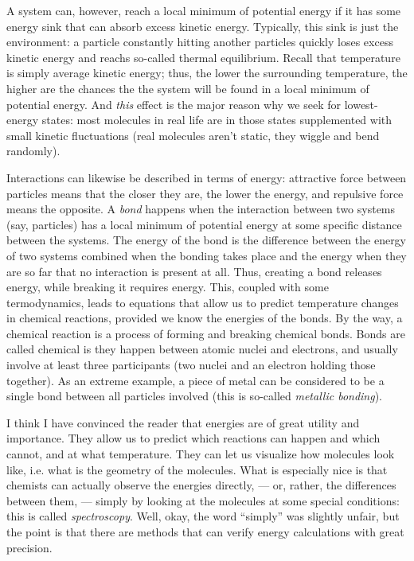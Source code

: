 \documentclass{article}
\begin{document}
A system can, however, reach a local minimum of potential energy if it has some energy sink that can absorb excess kinetic energy. Typically, this sink is just the environment: a particle constantly hitting another particles quickly loses excess kinetic energy and reachs so-called thermal equilibrium. Recall that temperature is simply average kinetic energy; thus, the lower the surrounding temperature, the higher are the chances the the system will be found in a local minimum of potential energy. And \textit{this} effect is the major reason why we seek for lowest-energy states: most molecules in real life are in those states supplemented with small kinetic fluctuations (real molecules aren't static, they wiggle and bend randomly).

Interactions can likewise be described in terms of energy: attractive force between particles means that the closer they are, the lower the energy, and repulsive force means the opposite. A \textit{bond} happens when the interaction between two systems (say, particles) has a local minimum of potential energy at some specific distance between the systems. The energy of the bond is the difference between the energy of two systems combined when the bonding takes place and the energy when they are so far that no interaction is present at all. Thus, creating a bond releases energy, while breaking it requires energy. This, coupled with some termodynamics, leads to equations that allow us to predict temperature changes in chemical reactions, provided we know the energies of the bonds. By the way, a chemical reaction is a process of forming and breaking chemical bonds. Bonds are called chemical is they happen between atomic nuclei and electrons, and usually involve at least three participants (two nuclei and an electron holding those together). As an extreme example, a piece of metal can be considered to be a single bond between all particles involved (this is so-called \textit{metallic bonding}).

I think I have convinced the reader that energies are of great utility and importance. They allow us to predict which reactions can happen and which cannot, and at what temperature. They can let us visualize how molecules look like, i.e. what is the geometry of the molecules. What is especially nice is that chemists can actually observe the energies directly, --- or, rather, the differences between them, --- simply by looking at the molecules at some special conditions: this is called \textit{spectroscopy}. Well, okay, the word ``simply'' was slightly unfair, but the point is that there are methods that can verify energy calculations with great precision.
\end{document}
